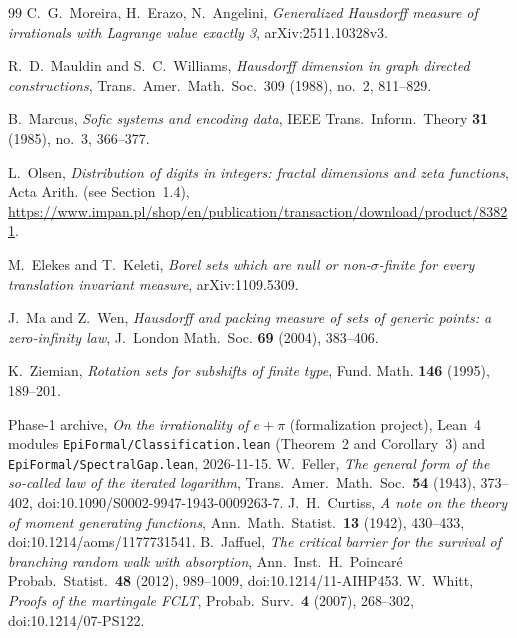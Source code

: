 \documentclass[11pt]{article}
\theoremstyle{definition}
\theoremstyle{remark}
\begin{document}
\begin{thebibliography}{99}
 C.~G.~Moreira, H.~Erazo, N.~Angelini,
\emph{Generalized Hausdorff measure of irrationals with Lagrange value exactly 3},
arXiv:2511.10328v3.

{\sloppy
{} R.~D.~Mauldin and S.~C.~Williams,
\emph{Hausdorff dimension in graph directed constructions},
Trans.~Amer.~Math.~Soc.~309 (1988), no.~2, 811--829.
}

 B.~Marcus, \emph{Sofic systems and encoding data},
IEEE Trans.~Inform.~Theory \textbf{31} (1985), no.~3, 366--377.

 L.~Olsen,
\emph{Distribution of digits in integers: fractal dimensions and zeta functions},
Acta Arith. (see Section~1.4),
\url{https://www.impan.pl/shop/en/publication/transaction/download/product/83821}.

 M.~Elekes and T.~Keleti,
\emph{Borel sets which are null or non-$\sigma$-finite for every
translation invariant measure}, arXiv:1109.5309.


J.~Ma and Z.~Wen, \emph{Hausdorff and packing measure of sets of
generic points: a zero-infinity law}, J.~London Math.~Soc.
\textbf{69} (2004), 383--406.

K.~Ziemian, \emph{Rotation sets for subshifts of finite type},
Fund. Math. \textbf{146} (1995), 189--201.

 Phase-1 archive, \emph{On the irrationality of $e+\pi$}
(formalization project), Lean~4 modules \texttt{EpiFormal/\allowbreak Classification.lean}
(Theorem~2 and Corollary~3) and \texttt{EpiFormal/\allowbreak Spectral\allowbreak Gap.lean}, 2026-11-15.
W.~Feller, \emph{The general form of the so-called law of the iterated
logarithm}, Trans.\ Amer.\ Math.\ Soc.\ \textbf{54} (1943), 373--402,
doi:10.1090/S0002-9947-1943-0009263-7.
J.~H.~Curtiss, \emph{A note on the theory of moment generating
functions}, Ann.\ Math.\ Statist.\ \textbf{13} (1942), 430--433,
doi:10.1214/aoms/1177731541.
B.~Jaffuel, \emph{The critical barrier for the survival of branching
random walk with absorption}, Ann.\ Inst.\ H.\ Poincar\'e Probab.\
Statist.\ \textbf{48} (2012), 989--1009, doi:10.1214/11-AIHP453.
\bibitem{WhittFCLT}
W.~Whitt, \emph{Proofs of the martingale FCLT},
Probab.\ Surv.\ \textbf{4} (2007), 268--302,
doi:10.1214/07-PS122.
\end{thebibliography}
\end{document}
